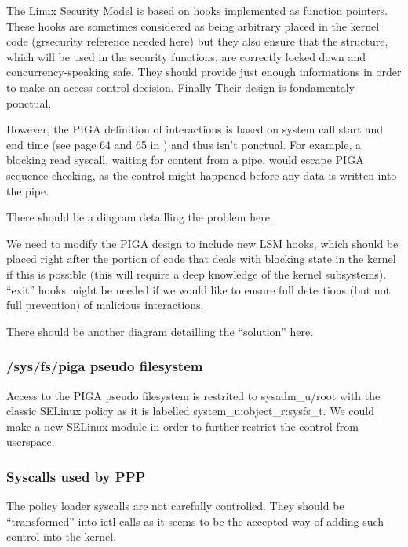 \documentclass[pdftex,a4paper,titlepage,11pt]{article}
\begin{document}
The Linux Security Model is based on hooks implemented as function pointers. These hooks are sometimes considered as being arbitrary placed in the kernel code (grsecurity reference needed here) but they also ensure that the structure, which will be used in the security functions, are correctly locked down and concurrency-speaking safe. They should provide just enough informations in order to make an access control decision. Finally Their design is fondamentaly ponctual.

\bigskip

However, the PIGA definition of interactions is based on system call start and end time (see page 64 and 65 in \cite{THESEBRIFFAUT}) and thus isn't ponctual. For example, a blocking read syscall, waiting for content from a pipe, would escape PIGA sequence checking, as the control might happened before any data is written into the pipe.

\bigskip

There should be a diagram detailling the problem here.

\bigskip

We need to modify the PIGA design to include new LSM hooks, which should be placed right after the portion of code that deals with blocking state in the kernel if this is possible (this will require a deep knowledge of the kernel subsystems). ``exit'' hooks might be needed if we would like to ensure full detections (but not full prevention) of malicious interactions.

\bigskip

There should be another diagram detailling the ``solution'' here.

\subsubsection{/sys/fs/piga pseudo filesystem}

Access to the PIGA pseudo filesystem is restrited to sysadm\_u/root with the classic SELinux policy as it is labelled system\_u:object\_r:sysfs\_t. We could make a new SELinux module in order to further restrict the control from userspace.

\subsubsection{Syscalls used by PPP}

The policy loader syscalls are not carefully controlled. They should be ``transformed'' into ictl calls as it seems to be the accepted way of adding such control into the kernel.
\end{document}
